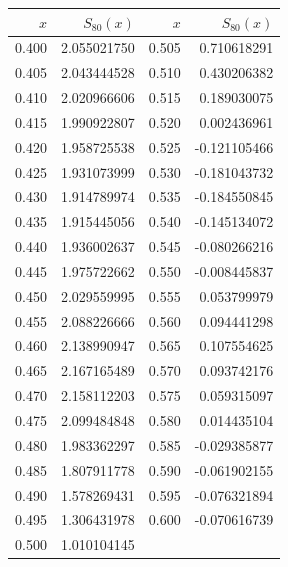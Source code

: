 \begin{center}\small\begin{tabular}{r r|r r}\toprule
$x$&$S_{80}(x)$&$x$&$S_{80}(x)$\\\midrule
0.400&2.055021750&0.505&0.710618291\\
0.405&2.043444528&0.510&0.430206382\\
0.410&2.020966606&0.515&0.189030075\\
0.415&1.990922807&0.520&0.002436961\\
0.420&1.958725538&0.525&-0.121105466\\
0.425&1.931073999&0.530&-0.181043732\\
0.430&1.914789974&0.535&-0.184550845\\
0.435&1.915445056&0.540&-0.145134072\\
0.440&1.936002637&0.545&-0.080266216\\
0.445&1.975722662&0.550&-0.008445837\\
0.450&2.029559995&0.555&0.053799979\\
0.455&2.088226666&0.560&0.094441298\\
0.460&2.138990947&0.565&0.107554625\\
0.465&2.167165489&0.570&0.093742176\\
0.470&2.158112203&0.575&0.059315097\\
0.475&2.099484848&0.580&0.014435104\\
0.480&1.983362297&0.585&-0.029385877\\
0.485&1.807911778&0.590&-0.061902155\\
0.490&1.578269431&0.595&-0.076321894\\
0.495&1.306431978&0.600&-0.070616739\\
0.500&1.010104145&&\\
\bottomrule\end{tabular}\end{center}
